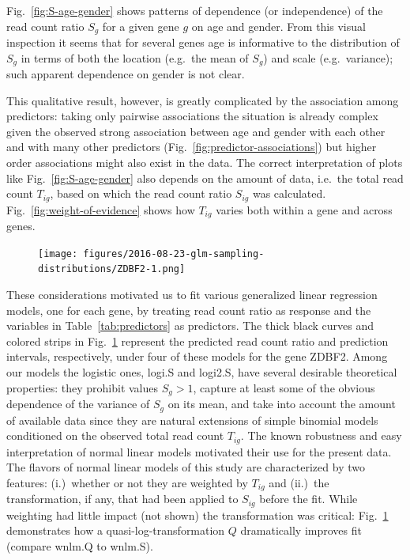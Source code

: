 \documentclass[letterpaper]{article}
\begin{document}
Fig.~\ref{fig:S-age-gender} shows patterns of dependence (or independence) of
the read count ratio \(S_g\) for a given gene \(g\) on age and gender.  From
this visual inspection it seems that for several genes age is informative to
the distribution of \(S_g\) in terms of both the location (e.g.~the mean of
\(S_g\)) and scale (e.g.~variance); such apparent dependence on gender is not
clear.

This qualitative result, however, is greatly complicated by the association
among predictors: taking only pairwise associations the situation is already
complex given the observed strong association between age and gender with each
other and with many other predictors (Fig.~\ref{fig:predictor-associations})
but higher order associations might also exist in the data.
The correct interpretation of plots like Fig.~\ref{fig:S-age-gender} also depends on
the amount of data, i.e.~the total read count \(T_{ig}\), based on which the
read count ratio \(S_{ig}\) was calculated.  Fig.~\ref{fig:weight-of-evidence}
shows how \(T_{ig}\) varies both within a gene and across genes.

\begin{figure}
\begin{center}
\texttt{[image: figures/2016-08-23-glm-sampling-distributions/ZDBF2-1.png]}
\end{center}
\caption{}
\label{fig:predicted-curves}
\end{figure}

These considerations motivated us to fit various generalized linear regression
models, one for each gene, by treating read count ratio as response and the
variables in Table~\ref{tab:predictors} as predictors. The thick black curves
and colored strips in Fig.~\ref{fig:predicted-curves} represent the predicted
read count ratio and prediction intervals, respectively, under four of these
models for the gene ZDBF2.  Among our models the logistic ones, logi.S and
logi2.S, have several desirable theoretical properties: they prohibit values
\(S_{g}>1\), capture at least some of the obvious dependence of the variance
of \(S_{g}\) on its mean, and take into account the amount of available data
since they are natural extensions of simple binomial models conditioned on the
observed total read count \(T_{ig}\).  The known robustness and easy
interpretation of normal linear models motivated their use for the
present data.  The flavors of normal linear models of this study are
characterized by two features: (i.)~whether or not they are weighted by
\(T_{ig}\) and (ii.)~the transformation, if any, that had been applied to
\(S_{ig}\) before the fit.  While weighting had little impact (not shown) the
transformation was critical: Fig.~\ref{fig:predicted-curves} demonstrates how
a quasi-log-transformation \(Q\) dramatically improves fit (compare wnlm.Q to
wnlm.S).
\end{document}
